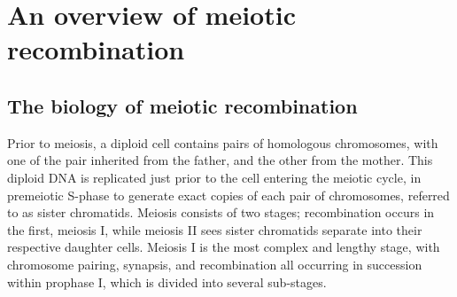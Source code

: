 \section{An overview of meiotic recombination}




\subsection{The biology of meiotic recombination}

Prior to meiosis, a diploid cell contains pairs of homologous chromosomes, with one of the pair inherited from the father, and the other from the mother.
This diploid DNA is replicated just prior to the cell entering the meiotic cycle, in premeiotic S-phase\cite{Bell2002} to generate exact copies of each pair of chromosomes, referred to as sister chromatids.
Meiosis consists of two stages; recombination occurs in the first, meiosis I, while meiosis II sees sister chromatids separate into their respective daughter cells.
Meiosis I is the most complex and lengthy stage, with chromosome pairing, synapsis, and recombination all occurring in succession within prophase I, which is  divided into several sub-stages.

